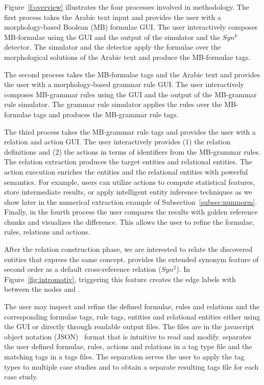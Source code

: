 


Figure~\ref{f:overview} illustrates the four processes involved in 
\framework methodology. 
The first process takes the Arabic text input and provides the user 
with a morphology-based Boolean (MB) formulae GUI. 
The user interactively composes MB-formulae using the GUI and the output 
of the simulator and the $Syn^k$ detector. 
The simulator and the detector apply the formulae over the morphological solutions 
of the Arabic text and produce the MB-formulae tags. 

The second process takes the MB-formulae tags and the Arabic text and provides
the user with a morphology-based grammar rule GUI. 
The user interactively composes MB-grammar rules using the GUI and the output 
of the MB-grammar rule simulator. 
The grammar rule simulator applies the rules over the MB-formulae tags and 
produces the MB-grammar rule tags. 

The third process takes the MB-grammar rule tags and provides the user with 
a relation and action GUI. 
The user interactively provides (1) the relation definitions and 
(2) the actions in terms of identifiers from the MB-grammar 
rules.
The relation extraction produces the target entities and relational
entities. 
The action execution enriches the entities and the relational entities
with powerful semantics.
For example, users can utilize actions to compute statistical features, 
store intermediate results, 
or apply intelligent entity inference techniques
as we show later in the numerical extraction example of 
Subsection~\ref{subsec:numnorm}.
%
Finally, in the fourth process the user compares the results with golden
reference chunks and visualizes the difference. 
This allows the user to refine the formulae, rules, relations and actions. 

After the relation construction phase, we are interested to relate the 
discovered entities that express the same concept.
\framework provides the extended synonym feature of second order as 
a default cross-reference relation ($Syn^2$).
In Figure~\ref{fig:intromotiv}, triggering this feature creates the 
edge labels with  
between the nodes  and .



The user may inspect and refine the defined formulae, rules and relations and 
the corresponding formulae tags, rule tags, entities and relational entities
either using the GUI or directly through readable output files. 
The files are in the javascript object notation (JSON)~\cite{nolan2014javascript} 
format that is intuitive to read and modify. 
\framework separates the user defined formulae, rules, actions and relations in
a \framework tag type file and the 
matching tags in a tags files. 
The separation serves the user to apply the tag types to multiple case studies 
and to obtain a separate resulting tags file for each case study. 


